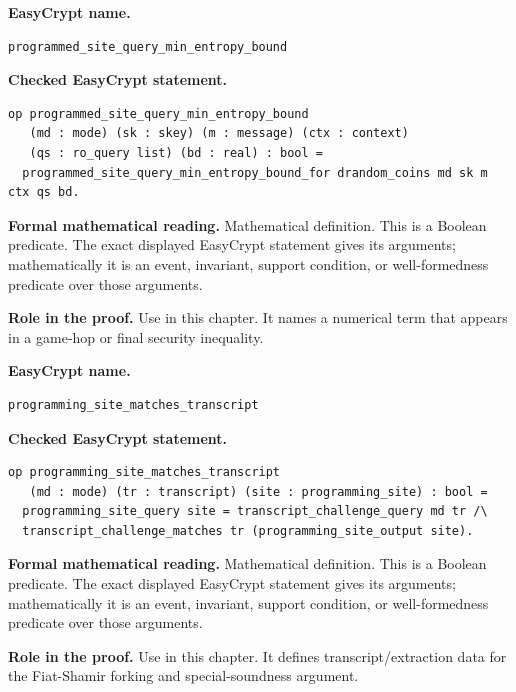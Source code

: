 \begin{formaldefinition}
\noindent\textbf{EasyCrypt name.}
\begin{lstlisting}[language=EasyCrypt,basicstyle=\ttfamily\scriptsize]
programmed_site_query_min_entropy_bound
\end{lstlisting}
\noindent\textbf{Checked EasyCrypt statement.}
\begin{lstlisting}[language=EasyCrypt,basicstyle=\ttfamily\scriptsize]
op programmed_site_query_min_entropy_bound
   (md : mode) (sk : skey) (m : message) (ctx : context)
   (qs : ro_query list) (bd : real) : bool =
  programmed_site_query_min_entropy_bound_for drandom_coins md sk m ctx qs bd.
\end{lstlisting}
\noindent\textbf{Formal mathematical reading.}
Mathematical definition. This is a Boolean predicate.  The exact displayed EasyCrypt statement gives its arguments; mathematically it is an event, invariant, support condition, or well-formedness predicate over those arguments.

\noindent\textbf{Role in the proof.}
Use in this chapter. It names a numerical term that appears in a game-hop or final security inequality.

\end{formaldefinition}

\begin{formaldefinition}
\noindent\textbf{EasyCrypt name.}
\begin{lstlisting}[language=EasyCrypt,basicstyle=\ttfamily\scriptsize]
programming_site_matches_transcript
\end{lstlisting}
\noindent\textbf{Checked EasyCrypt statement.}
\begin{lstlisting}[language=EasyCrypt,basicstyle=\ttfamily\scriptsize]
op programming_site_matches_transcript
   (md : mode) (tr : transcript) (site : programming_site) : bool =
  programming_site_query site = transcript_challenge_query md tr /\
  transcript_challenge_matches tr (programming_site_output site).
\end{lstlisting}
\noindent\textbf{Formal mathematical reading.}
Mathematical definition. This is a Boolean predicate.  The exact displayed EasyCrypt statement gives its arguments; mathematically it is an event, invariant, support condition, or well-formedness predicate over those arguments.

\noindent\textbf{Role in the proof.}
Use in this chapter. It defines transcript/extraction data for the Fiat-Shamir forking and special-soundness argument.

\end{formaldefinition}

